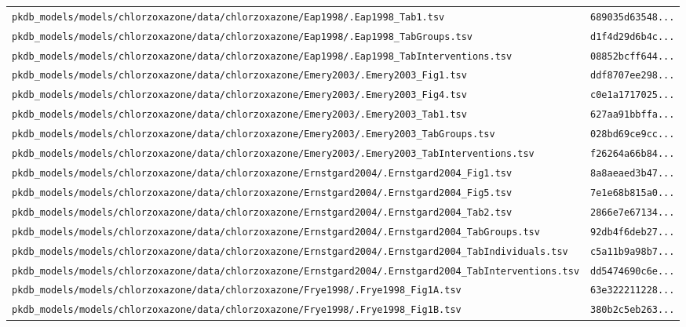 \begin{longtable}{ll}
\texttt{pkdb\_models/models/chlorzoxazone/data/chlorzoxazone/Eap1998/.Eap1998\_Tab1.tsv} & \texttt{689035d63548...} \\
\texttt{pkdb\_models/models/chlorzoxazone/data/chlorzoxazone/Eap1998/.Eap1998\_TabGroups.tsv} & \texttt{d1f4d29d6b4c...} \\
\texttt{pkdb\_models/models/chlorzoxazone/data/chlorzoxazone/Eap1998/.Eap1998\_TabInterventions.tsv} & \texttt{08852bcff644...} \\
\texttt{pkdb\_models/models/chlorzoxazone/data/chlorzoxazone/Emery2003/.Emery2003\_Fig1.tsv} & \texttt{ddf8707ee298...} \\
\texttt{pkdb\_models/models/chlorzoxazone/data/chlorzoxazone/Emery2003/.Emery2003\_Fig4.tsv} & \texttt{c0e1a1717025...} \\
\texttt{pkdb\_models/models/chlorzoxazone/data/chlorzoxazone/Emery2003/.Emery2003\_Tab1.tsv} & \texttt{627aa91bbffa...} \\
\texttt{pkdb\_models/models/chlorzoxazone/data/chlorzoxazone/Emery2003/.Emery2003\_TabGroups.tsv} & \texttt{028bd69ce9cc...} \\
\texttt{pkdb\_models/models/chlorzoxazone/data/chlorzoxazone/Emery2003/.Emery2003\_TabInterventions.tsv} & \texttt{f26264a66b84...} \\
\texttt{pkdb\_models/models/chlorzoxazone/data/chlorzoxazone/Ernstgard2004/.Ernstgard2004\_Fig1.tsv} & \texttt{8a8aeaed3b47...} \\
\texttt{pkdb\_models/models/chlorzoxazone/data/chlorzoxazone/Ernstgard2004/.Ernstgard2004\_Fig5.tsv} & \texttt{7e1e68b815a0...} \\
\texttt{pkdb\_models/models/chlorzoxazone/data/chlorzoxazone/Ernstgard2004/.Ernstgard2004\_Tab2.tsv} & \texttt{2866e7e67134...} \\
\texttt{pkdb\_models/models/chlorzoxazone/data/chlorzoxazone/Ernstgard2004/.Ernstgard2004\_TabGroups.tsv} & \texttt{92db4f6deb27...} \\
\texttt{pkdb\_models/models/chlorzoxazone/data/chlorzoxazone/Ernstgard2004/.Ernstgard2004\_TabIndividuals.tsv} & \texttt{c5a11b9a98b7...} \\
\texttt{pkdb\_models/models/chlorzoxazone/data/chlorzoxazone/Ernstgard2004/.Ernstgard2004\_TabInterventions.tsv} & \texttt{dd5474690c6e...} \\
\texttt{pkdb\_models/models/chlorzoxazone/data/chlorzoxazone/Frye1998/.Frye1998\_Fig1A.tsv} & \texttt{63e322211228...} \\
\texttt{pkdb\_models/models/chlorzoxazone/data/chlorzoxazone/Frye1998/.Frye1998\_Fig1B.tsv} & \texttt{380b2c5eb263...} \\

\end{longtable}
